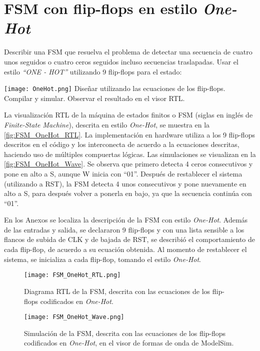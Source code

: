 \section{FSM con flip-flops en estilo \textit{One-Hot} \label{sec:s1}}

\begin{center}
	\begin{minipage}{12cm}
		\begin{tcolorbox}[title=Actividad 1]
			Describir una FSM que resuelva el problema de detectar una secuencia de cuatro unos seguidos o cuatro ceros seguidos incluso secuencias traslapadas. Usar el estilo \textit{``ONE - HOT''} utilizando 9 flip-flops para el estado:\enter
			
				\texttt{[image: OneHot.png]}
			Diseñar utilizando las ecuaciones de los flip-flops. Compilar y simular. Observar el resultado en el visor RTL.
		\end{tcolorbox}	
	\end{minipage}
\end{center}

La visualización RTL de la máquina de estados finitos o FSM (siglas en inglés de \textit{Finite-State Machine}), descrita en estilo \textit{One-Hot}, se muestra en la \autoref{fig:FSM_OneHot_RTL}. La implementación en hardware utiliza a los 9 flip-flops descritos en el código y los interconecta de acuerdo a la ecuaciones descritas, haciendo uso de múltiples compuertas lógicas. Las simulaciones se visualizan en la \autoref{fig:FSM_OneHot_Wave}. Se observa que primero detecta 4 ceros consecutivos y pone en alto a S, aunque W inicia con ``01''. Después de restablecer el sistema (utilizando a RST), la FSM detecta 4 unos consecutivos y pone nuevamente en alto a S, para después volver a ponerla en bajo, ya que la secuencia continúa con ``01''.

En los Anexos se localiza la descripción de la FSM con estilo \textit{One-Hot}. Además de las entradas y salida, se declararon 9 flip-flops y con una lista sensible a los flancos de subida de CLK y de bajada de RST, se describió el comportamiento de cada flip-flop, de acuerdo a su ecuación obtenida. Al momento de restablecer el sistema, se inicializa a cada flip-flop, tomando el estilo \textit{One-Hot}.

\begin{figure}[ht]
	\centering
	\texttt{[image: FSM\_OneHot\_RTL.png]}
	\caption{Diagrama RTL de la FSM, descrita con las ecuaciones de los flip-flops codificados en \textit{One-Hot}. \label{fig:FSM_OneHot_RTL}}
\end{figure}

\begin{figure}[ht]
	\centering
	\texttt{[image: FSM\_OneHot\_Wave.png]}
	\caption{Simulación de la FSM, descrita con las ecuaciones de los flip-flops codificados en \textit{One-Hot}, en el visor de formas de onda de ModelSim. \label{fig:FSM_OneHot_Wave}}
\end{figure}